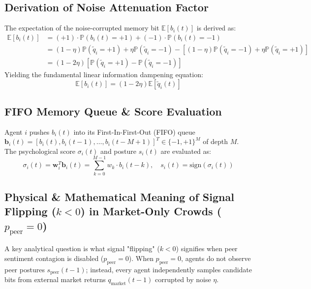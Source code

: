 \documentclass[11pt,a4paper]{article}
\begin{document}
\subsection{Derivation of Noise Attenuation Factor}
The expectation of the noise-corrupted memory bit $\mathbb{E}[b_i(t)]$ is derived as:
\begin{align}
    \mathbb{E}[b_i(t)] &= (+1) \cdot \mathbb{P}(b_i(t) = +1) + (-1) \cdot \mathbb{P}(b_i(t) = -1) \\
    &= (1 - \eta) \mathbb{P}(\tilde{q}_i = +1) + \eta \mathbb{P}(\tilde{q}_i = -1) - \left[ (1 - \eta) \mathbb{P}(\tilde{q}_i = -1) + \eta \mathbb{P}(\tilde{q}_i = +1) \right] \\
    &= (1 - 2\eta) \left[ \mathbb{P}(\tilde{q}_i = +1) - \mathbb{P}(\tilde{q}_i = -1) \right]
\end{align}
Yielding the fundamental linear information dampening equation:
\begin{equation}
    \mathbb{E}[b_i(t)] = (1 - 2\eta) \mathbb{E}[\tilde{q}_i(t)]
\end{equation}

\subsection{FIFO Memory Queue \& Score Evaluation}
Agent $i$ pushes $b_i(t)$ into its First-In-First-Out (FIFO) queue $\mathbf{b}_i(t) = [b_i(t), b_i(t-1), \dots, b_i(t-M+1)]^T \in \{-1, +1\}^M$ of depth $M$. The psychological score $\sigma_i(t)$ and posture $s_i(t)$ are evaluated as:
\begin{equation}
    \sigma_i(t) = \mathbf{w}_i^T \mathbf{b}_i(t) = \sum_{k=0}^{M-1} w_k \cdot b_i(t-k), \quad s_i(t) = \text{sign}(\sigma_i(t))
\end{equation}

\subsection{Physical \& Mathematical Meaning of Signal Flipping ($k < 0$) in Market-Only Crowds ($p_{\text{peer}} = 0$)}

A key analytical question is what signal "flipping" ($k < 0$) signifies when peer sentiment contagion is disabled ($p_{\text{peer}} = 0$). When $p_{\text{peer}} = 0$, agents do not observe peer postures $s_{\text{peer}}(t-1)$; instead, every agent independently samples candidate bits from external market returns $q_{\text{market}}(t-1)$ corrupted by noise $\eta$.
\end{document}
